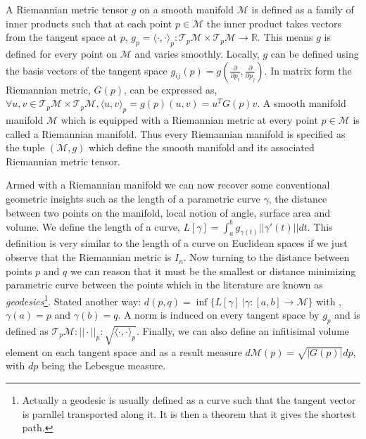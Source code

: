 A Riemannian metric tensor $g$ on a smooth manifold $\mathcal{M}$ is defined as a family of inner products such that at each point $p \in \mathcal{M}$ the inner product takes vectors from the tangent space at $p$, $g_p= \langle \cdot, \cdot \rangle_p: \mathcal{T}_p\mathcal{M} \times \mathcal{T}_p\mathcal{M} \to \mathbb{R}$. This means $g$ is defined for every point on $\mathcal{M}$ and varies smoothly. Locally, $g$ can be defined using the basis vectors of the tangent space $g_{ij}(p) = g(\frac{\partial}{\partial p_i}, \frac{\partial}{\partial p_j})$. In matrix form the Riemannian metric, $G(p)$, can be expressed as, $\forall u,v \in  \mathcal{T}_p\mathcal{M} \times \mathcal{T}_p\mathcal{M}, \langle u, v \rangle_p = g(p)(u,v) = u^T G(p) v$. A smooth manifold manifold $\mathcal{M}$ which is equipped with a Riemannian metric at every point $p \in \mathcal{M}$ is called a Riemannian manifold. Thus every Riemannian manifold is specified as the tuple $(\mathcal{M},g)$ which define the smooth manifold and its associated Riemannian metric tensor.

Armed with a Riemannian manifold we can now recover some conventional geometric insights such as the length of a parametric curve $\gamma$, the distance between two points on the manifold, local notion of angle, surface area and volume. We define the length of a curve, $L[\gamma] = \int_a^b g_{\gamma (t)} || \gamma '(t)|| dt$. This definition is very similar to the length of a curve on Euclidean spaces if we just observe that the Riemannian metric is $I_n$. Now turning to the distance between points $p$ and $q$ we can reason that it must be the smallest or distance minimizing parametric curve between the points which in the literature are known as \textit{geodesics}\footnote{Actually a geodesic is usually defined as a curve such that the tangent vector is parallel transported along it. It is then a theorem that it gives the shortest path.}. Stated another way: $d(p,q) = \inf \big\{ L[\gamma] \ | \gamma:[a,b] \to \mathcal{M}\big\}$ with ,  $\gamma(a)=p$ and $\gamma(b)=q$. A norm is induced on every tangent space by $g_p$ and is defined as $\mathcal{T}_p\mathcal{M}: || \cdot ||_p :\sqrt{\langle \cdot, \cdot \rangle_p}$. Finally, we can also define an infitisimal volume element on each tangent space and as a result measure $d\mathcal{M}(p) = \sqrt{|G(p)|} dp$, with $dp$ being the Lebesgue measure. 

